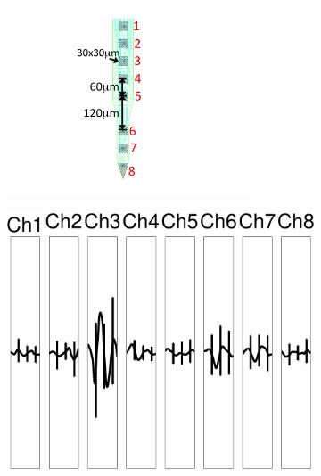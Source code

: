 \begin{center}
\begin{figure}
\begin{subfigure}[b]{.12\textwidth}
\includegraphics[width=0.8\textwidth]{../figs/8dev}
\caption{}
\label{8dev}
\end{subfigure}
\begin{subfigure}[b]{.28\textwidth}
\includegraphics[width=\textwidth]{../figs/8devim/clus3}
\caption{}
\label{ex81}
\end{subfigure}
\begin{subfigure}[b]{.28\textwidth}

\end{subfigure}
\end{figure}
\end{center}
